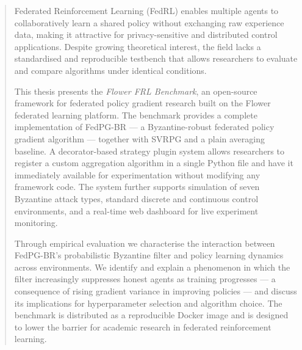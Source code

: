 \begin{abstract}
Federated Reinforcement Learning (FedRL) enables multiple agents to collaboratively
learn a shared policy without exchanging raw experience data, making it attractive
for privacy-sensitive and distributed control applications. Despite growing theoretical
interest, the field lacks a standardised and reproducible testbench that allows
researchers to evaluate and compare algorithms under identical conditions.

This thesis presents the \emph{Flower FRL Benchmark}, an open-source framework for
federated policy gradient research built on the Flower federated learning platform.
The benchmark provides a complete implementation of FedPG-BR --- a Byzantine-robust
federated policy gradient algorithm --- together with SVRPG and a plain averaging
baseline. A decorator-based strategy plugin system allows researchers to register a
custom aggregation algorithm in a single Python file and have it immediately available
for experimentation without modifying any framework code. The system further supports
simulation of seven Byzantine attack types, standard discrete and continuous control
environments, and a real-time web dashboard for live experiment monitoring.

Through empirical evaluation we characterise the interaction between FedPG-BR's
probabilistic Byzantine filter and policy learning dynamics across environments. We
identify and explain a phenomenon in which the filter increasingly suppresses honest
agents as training progresses --- a consequence of rising gradient variance in improving
policies --- and discuss its implications for hyperparameter selection and algorithm
choice. The benchmark is distributed as a reproducible Docker image and is designed
to lower the barrier for academic research in federated reinforcement learning.
\end{abstract}
